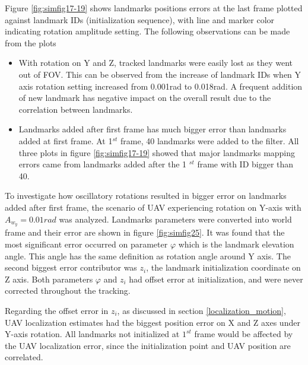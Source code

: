 Figure \ref{fig:simfig17-19} shows landmarks positions errors at
the last frame plotted against landmark IDs (initialization
sequence), with line and marker color indicating rotation amplitude
setting. The following observations can be made from the plots

\begin{itemize}
  \item With rotation on Y and Z, tracked landmarks were easily lost
  as they went out of FOV. This can be observed from the increase of
  landmark IDs when Y axis rotation setting increased from 0.001rad to
  0.018rad. A frequent addition of new landmark has negative impact on
  the overall result due to the correlation between landmarks.
  \item Landmarks added after first frame has much bigger error than
  landmarks added at first frame. At 1$^{st}$ frame, 40 landmarks were
  added to the filter. All three plots in figure \ref{fig:simfig17-19}
  showed that major landmarks mapping errors came from landmarks added
  after the 1 $^{st}$ frame with ID bigger than 40.
\end{itemize}
\FloatBarrier

To investigate how oscillatory rotations resulted in bigger error on
landmarks added after first frame, the scenario of UAV experiencing
rotation on Y-axis with $A_{w_y}=0.01rad$ was analyzed. Landmarks
parameters were converted into world frame and their error are shown
in figure \ref{fig:simfig25}. It was found that the most significant
error occurred on parameter $\varphi$ which is the landmark elevation
angle. This angle has the same definition as rotation angle around Y
axis. The second biggest error contributor was $z_i$, the landmark
initialization coordinate on Z axis. Both parameters $\varphi$ and
$z_i$ had offset error at initialization, and were never corrected
throughout the tracking.

Regarding the offset error in $z_i$, as discussed in section
\ref{localization_motion}, UAV localization estimates had the biggest
position error on X and Z axes under Y-axis rotation. All landmarks
not initialized at $1^{st}$ frame would be affected by the UAV
localization error, since the initialization point and UAV position
are correlated.

